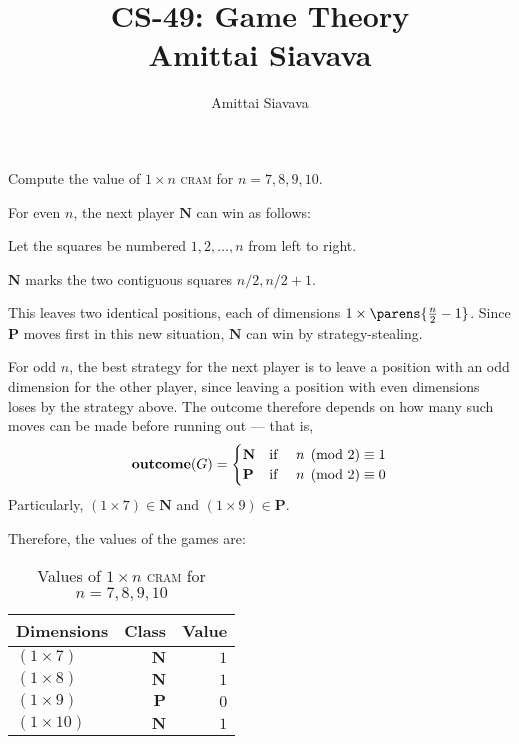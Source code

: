 \documentclass[11pt, reqno]{amsart}
\begin{document}

\title{CS-49: Game Theory\\ Amittai Siavava \\ }
\author{Amittai Siavava}


\setlength{\headheight}{13.0pt}
\setlength{\footskip}{15.0pt}

\maketitle

\bigskip

\def \cram { \textsc{cram} }
\def \dom { \textsc{domineering} }
\def \sub { \textsc{subtraction} }
\def \weighted { \textsc{weighted odds and evens}}
\def \nim { \textsc{nim} }
\def \P { \mathbf{P}}
\def \N { \mathbf{N}}

\newpage
\begin{problem}[12]
  Compute the value of $1 \times n$ \cram for $n = 7, 8, 9, 10$.

  \step
  For even $n$, the next player $\N$ can win as follows:
  \begin{enumroman}
    \item Let the squares be numbered $1, 2, \ldots, n$ from left to right.
    \item $\N$ marks the two contiguous squares $n/2, n/2 + 1$.
    \item This leaves two identical positions, each of dimensions
      $1 \times \parens{\frac{n}{2} - 1}$.
      Since $\P$ moves first in this new situation, $\N$ can win by strategy-stealing.
  \end{enumroman}
  
  \step
  For odd $n$, the best strategy for the next player is to leave a position with an odd
  dimension for the other player, since leaving a position with even dimensions
  loses by the strategy above.
  The outcome therefore depends on how many such moves can be made before running out
  --- that is,
  \[ \mathbf{outcome}(G) = \begin{cases}
      \N & \text{if \quad $n \pmod 2 \equiv 1$} \\
      \P & \text{if \quad $n \pmod 2 \equiv 0$}
  \end{cases} \]
  Particularly, $(1 \times 7) \in \N$ and $(1 \times 9) \in \P$.

  \step
  Therefore, the values of the games are:
  \begin{table}[h]
    \centering
    \begin{tabular}{|l|r|r|}
      Dimensions & Class & Value \\
      \bottomrule
      $(1 \times 7)$ & $\N$ & $1$ \\
      $(1 \times 8)$ & $\N$ & $1$ \\
      $(1 \times 9)$ & $\P$ & $0$ \\
      $(1 \times 10)$ & $\N$ & $1$ \\
      \toprule
    \end{tabular}
    \caption{Values of $1 \times n$ \cram for $n = 7, 8, 9, 10$}
  \end{table}
\end{problem}
\end{document}
